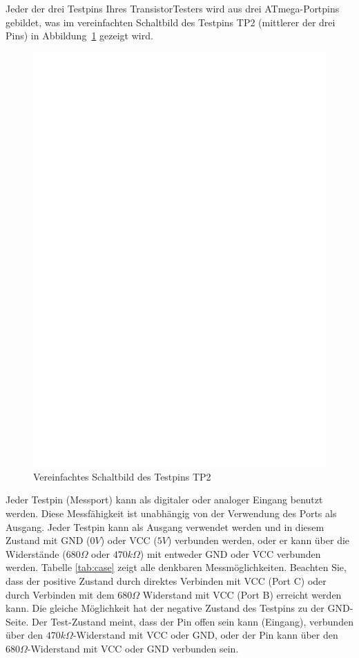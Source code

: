 Jeder der drei Testpins Ihres TransistorTesters wird aus drei ATmega-Portpins gebildet,
was im vereinfachten Schaltbild des Testpins TP2 (mittlerer der drei Pins) in Abbildung~\ref{fig:terminal} gezeigt wird.

\begin{figure}[H]
\centering
\includegraphics[]{../FIG/terminal.eps}
\caption{Vereinfachtes Schaltbild des Testpins TP2}
\label{fig:terminal}
\end{figure}

Jeder Testpin (Messport) kann als digitaler oder analoger Eingang benutzt werden.
Diese Mess\-fähig\-keit ist un\-abhän\-gig von der Verwendung des Ports als Ausgang.
Jeder Testpin kann als Ausgang verwendet werden und in diesem Zustand mit GND (\(0V\)) oder VCC (\(5V\)) verbunden werden,
oder er kann über die Widerstände (\(680\Omega\) oder \(470k\Omega\)) mit entweder GND oder VCC verbunden werden.
Tabelle \ref{tab:case} zeigt alle denkbaren Messmöglichkeiten.
Beachten Sie, dass der positive Zustand durch direktes Verbinden mit VCC (Port C) oder
durch Verbinden mit dem \(680\Omega\) Widerstand mit VCC (Port B) erreicht werden kann.
Die gleiche Möglichkeit hat der negative Zustand des Testpins zu der GND-Seite.
Der Test-Zustand meint, dass der Pin offen sein kann (Eingang), verbunden über den \(470k\Omega\)-Widerstand
mit VCC oder GND, oder der Pin kann über den \(680\Omega\)-Widerstand mit VCC oder GND verbunden sein.

